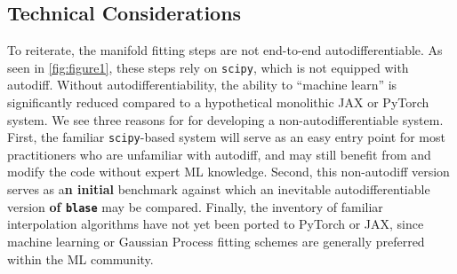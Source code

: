 \documentclass[twocolumn, linenumbers]{aastex631}
\begin{document}
\subsection{Technical Considerations}
To reiterate, the manifold fitting steps are not end-to-end autodifferentiable.
As seen in \autoref{fig:figure1}, these steps rely on \texttt{scipy}, which is not equipped with autodiff.
Without autodifferentiability, the ability to ``machine learn'' is significantly reduced compared to a hypothetical monolithic JAX or PyTorch system.
We see three reasons for for developing a non-autodifferentiable system.
First, the familiar \texttt{scipy}-based system will serve as an easy entry point for most practitioners who are unfamiliar with autodiff, and may still benefit from and modify the code without expert ML knowledge.
Second, this non-autodiff version serves as a\textbf{n initial} benchmark against which an inevitable autodifferentiable version \textbf{of \texttt{blase}} may be compared.
Finally, the inventory of familiar interpolation algorithms have not yet been ported to PyTorch or JAX, since machine learning or Gaussian Process fitting schemes are generally preferred within the ML community.
\end{document}
